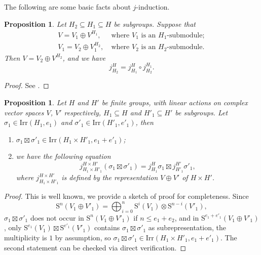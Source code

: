 \documentclass[12pt, a4paper]{amsart}
\numberwithin{equation}{section}
\newtheorem{prop}[thm]{Proposition}
\newcommand{\Irr}{{\mathrm{Irr}}}
\begin{document}
The following are some basic facts about $j$-induction.

\begin{prop}\label{2.5}
    Let $H_2 \subseteq H_1 \subseteq H$ be subgroups. Suppose that
    \begin{equation}
        \begin{split}
            V = V_1 \oplus V^{H_1}, \ & \textrm{where $V_1$ is an $H_1$-submodule}; \\
            V_1 = V_2 \oplus V_1^{H_2}, \ & \textrm{where $V_2$ is an $H_2$-submodule}.
        \end{split}
    \end{equation}
    Then $V = V_2 \oplus V^{H_2}$, and we have
    \begin{equation}
        j_{H_2}^{H} = j_{H_1}^{H} \circ j_{H_2}^{H_1}.
    \end{equation}
\end{prop}

\begin{proof}
    See \cite[Proposition 11.2.4]{Car}.
\end{proof}

\begin{prop}\label{2.6}
    Let $H$ and $H'$ be finite groups, with linear actions on complex vector spaces $V$, $V'$ respectively, $H_1 \subseteq H$ and $H'_1 \subseteq H'$ be subgroups. Let $\sigma_1 \in \Irr(H_1,e_1)$ and $\sigma'_1 \in \Irr(H'_1,e'_1)$, then
    \begin{enumerate}
        \item $\sigma_1 \boxtimes \sigma'_1 \in \Irr(H_1 \times H'_1,e_1 + e'_1)$;
        \item we have the following equation 
            \begin{equation}
            j_{H_1 \times H'_1}^{H \times H'}(\sigma_1 \boxtimes \sigma'_1) = j_{H_1}^{H}\sigma_1 \boxtimes j_{H'_1}^{H'}\sigma'_1,
            \end{equation}
            where $j_{H_1 \times H'_1}^{H \times H'}$ is defined by the representation $V \oplus V'$ of $H \times H'$.
    \end{enumerate}
\end{prop}

\begin{proof}
    This is well known, we provide a sketch of proof for completeness.
    Since
    $$\mathrm{S}^{n}(V_1 \oplus V'_1) = \bigoplus_{i = 0}^{n}\mathrm{S}^{i}(V_1) \otimes \mathrm{S}^{n-i}(V'_1),$$
    $\sigma_1 \boxtimes \sigma'_1 $ does not occur in $\mathrm{S}^{n}(V_1 \oplus V'_1)$ if $n \leq e_1 + e_2$, and in $\mathrm{S}^{e_1+e'_1}(V_1 \oplus V'_1)$,
    only $\mathrm{S}^{e_1}(V_1) \boxtimes \mathrm{S}^{e'_1}(V'_1)$ contains $\sigma_1 \boxtimes \sigma'_1$ as subrepresentation, the multiplicity is $1$ by assumption, so $\sigma_1 \boxtimes \sigma'_1 \in \Irr(H_1 \times H'_1, e_1+e'_1)$.
    The second statement can be checked via direct verification.
\end{proof}
\end{document}
